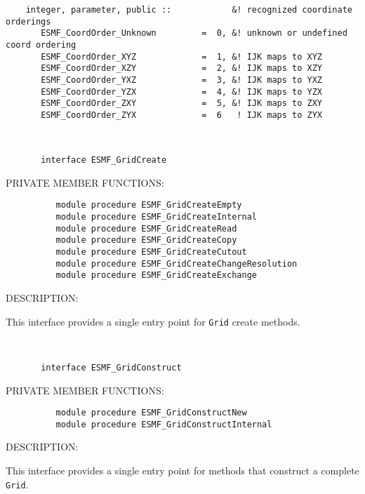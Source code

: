 \begin{verbatim}
    integer, parameter, public ::            &! recognized coordinate orderings
       ESMF_CoordOrder_Unknown         =  0, &! unknown or undefined coord ordering
       ESMF_CoordOrder_XYZ             =  1, &! IJK maps to XYZ
       ESMF_CoordOrder_XZY             =  2, &! IJK maps to XZY
       ESMF_CoordOrder_YXZ             =  3, &! IJK maps to YXZ
       ESMF_CoordOrder_YZX             =  4, &! IJK maps to YZX
       ESMF_CoordOrder_ZXY             =  5, &! IJK maps to ZXY
       ESMF_CoordOrder_ZYX             =  6   ! IJK maps to ZYX\end{verbatim}
 
 
\mbox{}\hrulefill\ 
 

\begin{verbatim}       interface ESMF_GridCreate
 \end{verbatim}{\sf PRIVATE MEMBER FUNCTIONS:}
\begin{verbatim}          module procedure ESMF_GridCreateEmpty
          module procedure ESMF_GridCreateInternal
          module procedure ESMF_GridCreateRead
          module procedure ESMF_GridCreateCopy
          module procedure ESMF_GridCreateCutout
          module procedure ESMF_GridCreateChangeResolution
          module procedure ESMF_GridCreateExchange
 \end{verbatim}
{\sf DESCRIPTION:\\ }


       This interface provides a single entry point for {\tt Grid} create
       methods.
   
 
\mbox{}\hrulefill\ 
 

\begin{verbatim}       interface ESMF_GridConstruct
 \end{verbatim}{\sf PRIVATE MEMBER FUNCTIONS:}
\begin{verbatim}          module procedure ESMF_GridConstructNew
          module procedure ESMF_GridConstructInternal
 \end{verbatim}
{\sf DESCRIPTION:\\ }


       This interface provides a single entry point for methods that construct a
       complete {\tt Grid}.
   
 
